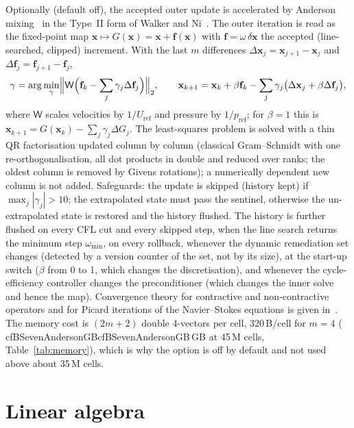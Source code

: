 \documentclass[11pt,a4paper]{article}
\newcommand{\cfpendingmark}{\fbox{\scriptsize pending}}
\newcommand{\cfnum}[1]{%
  \ifcsname cf#1\endcsname\csname cf#1\endcsname\else\cfpendingmark\fi}
\newcommand{\vect}[1]{\mathbf{#1}}
\begin{document}
Optionally (default off), the accepted outer update is accelerated by
Anderson mixing~\cite{Anderson1965} in the Type~II form of Walker and
Ni~\cite{WalkerNi2011}. The outer iteration is read as the fixed-point map
$\vect x\mapsto G(\vect x)=\vect x+\vect f(\vect x)$ with
$\vect f=\omega\,\delta\vect x$ the accepted (line-searched, clipped)
increment. With the last $m$ differences
$\Delta\vect x_j=\vect x_{j+1}-\vect x_j$ and
$\Delta\vect f_j=\vect f_{j+1}-\vect f_j$,
\begin{equation}
  \vect\gamma=\arg\min_{\vect\gamma}\Bigl\|\mathsf W\Bigl(\vect f_k-\sum_j\gamma_j\Delta\vect f_j\Bigr)\Bigr\|_2,
  \qquad
  \vect x_{k+1}=\vect x_k+\beta\vect f_k-\sum_j\gamma_j\bigl(\Delta\vect x_j+\beta\Delta\vect f_j\bigr),
\end{equation}
where $\mathsf W$ scales velocities by $1/U_{\mathrm{ref}}$ and pressure by
$1/p_{\mathrm{ref}}$; for $\beta=1$ this is
$\vect x_{k+1}=G(\vect x_k)-\sum_j\gamma_j\Delta G_j$. The least-squares
problem is solved with a thin QR factorisation updated column by column
(classical Gram--Schmidt with one re-orthogonalisation, all dot products in
double and reduced over ranks; the oldest column is removed by Givens
rotations); a numerically dependent new column is not added. Safeguards: the
update is skipped (history kept) if $\max_j|\gamma_j|>10$; the extrapolated
state must pass the sentinel, otherwise the un-extrapolated state is
restored and the history flushed. The history is further flushed on every
CFL cut and every skipped step, when the line search returns the minimum
step $\omega_{\min}$, on every rollback, whenever the dynamic remediation set
changes (detected by a version counter of the set, not by its size), at the
start-up switch ($\beta$ from 0 to 1, which changes the discretisation), and
whenever the cycle-efficiency controller changes the preconditioner (which
changes the inner solve and hence the map). Convergence theory
for contractive and non-contractive operators and for Picard iterations of
the Navier--Stokes equations is given in~\cite{PollockRebholz2021,Pollock2019}.
The memory cost is $(2m+2)$ double 4-vectors per cell, 320\,B/cell for $m=4$
(\cfnum{BSevenAndersonGB}\,GB at 45\,M cells, Table~\ref{tab:memory}),
which is why the option is off by default and not used above about 35\,M
cells.

\section{Linear algebra}\label{sec:la}
\end{document}
